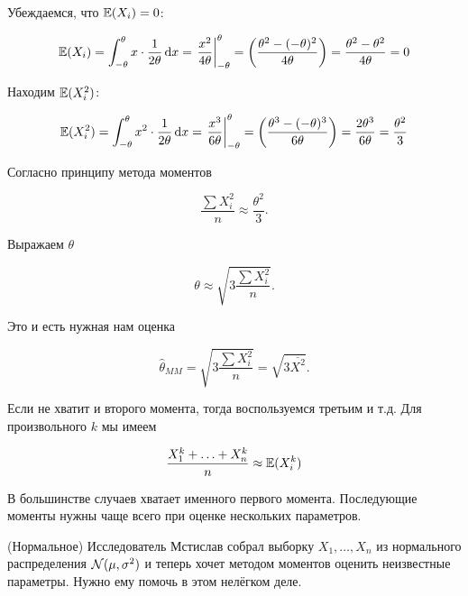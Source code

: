 \documentclass[12pt, a4paper, oneside]{article}
\begin{document}
\begin{sol}
Убеждаемся, что $\mathbb{E}(X_{i})=0$:

\[  \mathbb{E}(X_{i}) = \int _{-\theta}^{\theta} x \cdot \frac{1}{2\theta} \,\mathrm{d}x = \left. \frac{x^2}{4 \theta} \right|_{-\theta}^{\theta} = \left( \frac{\theta^2 - (-\theta)^2 }{4 \theta}  \right) =  \frac{\theta^{2} - \theta^{2}}{4 \theta} = 0  \]

Находим $ \mathbb{E}(X_{i}^{2}) $:

\[  \mathbb{E}(X_{i}^{2}) = \int _{-\theta}^{\theta} x^{2} \cdot \frac{1}{2\theta}  \,\mathrm{d}x = \left. \frac{x^3}{6 \theta} \right|_{-\theta}^{\theta} = \left( \frac{\theta^3 - (-\theta)^3 }{6\theta}  \right) = \frac{2 \theta^{3}}{6\theta}  = \frac{\theta^{2}}{3}  \]

Согласно принципу метода моментов

\[ \frac{\sum X_{i}^{2}}{n} \approx \frac{\theta^{2}}{3}.\]

Выражаем $ \theta $

\[ \theta\approx \sqrt{3\frac{\sum X_{i}^{2}}{n} }.\]

Это и есть нужная нам оценка

\[ \hat{\theta}_{MM}= \sqrt{3\frac{\sum X_{i}^{2}}{n} } = \sqrt{3 \overline{X^2 } }.\]
\end{sol}

Если не хватит и второго момента, тогда воспользуемся третьим и т.д. Для произвольного $k$ мы имеем

\[ \frac{X_{1}^{k} + \ldots + X_{n}^{k}}{n} \approx \mathbb{E}(X_{i}^{k})\]

В большинстве случаев хватает именного первого момента. Последующие моменты нужны чаще всего при оценке нескольких параметров.

\begin{problem}{(Нормальное)}
Исследователь Мстислав собрал выборку $X_1, \ldots, X_n$ из нормального распределения $\mathcal{N}(\mu, \sigma^2)$ и теперь хочет методом моментов оценить неизвестные параметры. Нужно ему помочь в этом нелёгком деле.
\end{problem}
\end{document}
